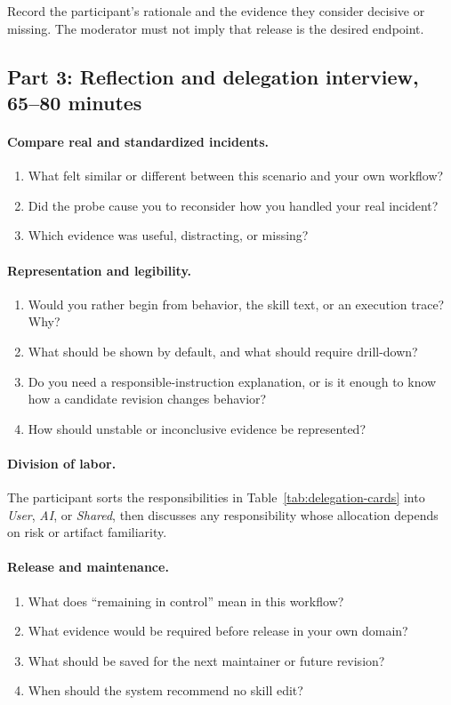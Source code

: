 Record the participant's rationale and the evidence they consider decisive or
missing. The moderator must not imply that release is the desired endpoint.

\subsection{Part 3: Reflection and delegation interview, 65--80 minutes}

\paragraph{Compare real and standardized incidents.}
\begin{enumerate}[leftmargin=*]
    \item What felt similar or different between this scenario and your own
    workflow?
    \item Did the probe cause you to reconsider how you handled your real
    incident?
    \item Which evidence was useful, distracting, or missing?
\end{enumerate}

\paragraph{Representation and legibility.}
\begin{enumerate}[leftmargin=*]
    \item Would you rather begin from behavior, the skill text, or an execution
    trace? Why?
    \item What should be shown by default, and what should require drill-down?
    \item Do you need a responsible-instruction explanation, or is it enough to
    know how a candidate revision changes behavior?
    \item How should unstable or inconclusive evidence be represented?
\end{enumerate}

\paragraph{Division of labor.}
The participant sorts the responsibilities in
Table~\ref{tab:delegation-cards} into \emph{User}, \emph{AI}, or \emph{Shared},
then discusses any responsibility whose allocation depends on risk or artifact
familiarity.

\paragraph{Release and maintenance.}
\begin{enumerate}[leftmargin=*]
    \item What does ``remaining in control'' mean in this workflow?
    \item What evidence would be required before release in your own domain?
    \item What should be saved for the next maintainer or future revision?
    \item When should the system recommend no skill edit?
\end{enumerate}

